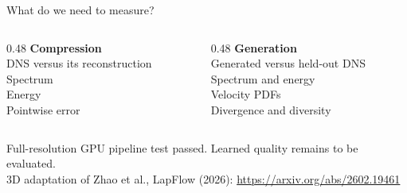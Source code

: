 \documentclass[aspectratio=169,12pt]{beamer}
\begin{document}
\begin{frame}{What do we need to measure?}
 \begin{columns}[T]
  \begin{column}{0.48\textwidth}
   \textbf{Compression}\\[0.35cm]
   DNS versus its reconstruction\\[0.4cm]
   Spectrum\\
   Energy\\
   Pointwise error
  \end{column}
  \begin{column}{0.48\textwidth}
   \textbf{Generation}\\[0.35cm]
   Generated versus held-out DNS\\[0.4cm]
   Spectrum and energy\\
   Velocity PDFs\\
   Divergence and diversity
  \end{column}
 \end{columns}
 \vfill
 {\small\color{gray}Full-resolution GPU pipeline test passed. Learned quality remains to be evaluated.}\\[0.2cm]
 {\footnotesize\color{gray}3D adaptation of Zhao et al., LapFlow (2026): \url{https://arxiv.org/abs/2602.19461}}
\end{frame}
\end{document}

